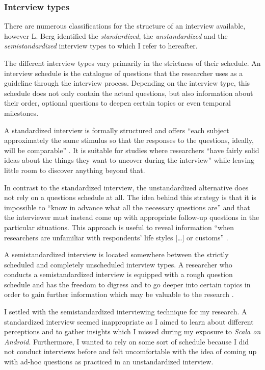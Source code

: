 \subsubsection{Interview types}

There are numerous classifications for the structure of an interview available, however L. Berg identified the \textit{standardized}, the \textit{unstandardized} and the \textit{semistandardized} interview types \cite[p. 68]{berg01} to which I refer to hereafter.

The different interview types vary primarily in the strictness of their schedule. An interview schedule is the catalogue of questions that the researcher uses as a guideline through the interview process. Depending on the interview type, this schedule does not only contain the actual questions, but also information about their order, optional questions to deepen certain topics or even temporal milestones.

A standardized interview is formally structured and offers \enquote{each subject approximately the same stimulus so that the responses to the questions, ideally, will be comparable} \cite[p. 69]{berg01}. It is suitable for studies where researchers \enquote{have fairly solid ideas about the things they want to uncover during the interview} \cite[p. 69]{berg01} while leaving little room to discover anything beyond that.

In contrast to the standardized interview, the unstandardized alternative does not rely on a questions schedule at all. The idea behind this strategy is that it is impossible to \enquote{know in advance what all the necessary questions are} \cite[p. 70]{berg01} and that the interviewer must instead come up with appropriate follow-up questions in the particular situations. This approach is useful to reveal information \enquote{when researchers are unfamiliar with respondents' life styles […] or customs} \cite[p. 70]{berg01}.

A semistandardized interview is located somewhere between the strictly scheduled and completely unscheduled interview types. A researcher who conducts a semistandardized interview is equipped with a rough question schedule and has the freedom to digress and to go deeper into certain topics in order to gain further information which may be valuable to the research \cite[p. 70]{berg01}.

I settled with the semistandardized interviewing technique for my research. A standardized interview seemed inappropriate as I aimed to learn about different perceptions and to gather insights which I missed during my exposure to \textit{Scala on Android}. Furthermore, I wanted to rely on some sort of schedule because I did not conduct interviews before and felt uncomfortable with the idea of coming up with ad-hoc questions as practiced in an unstandardized interview.

